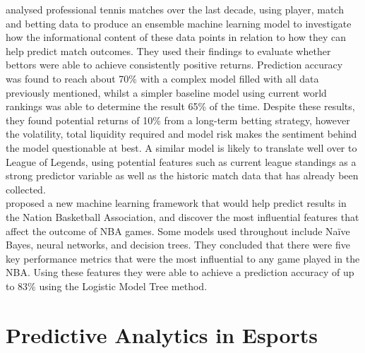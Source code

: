 \citet{wilkens2021sports} analysed professional tennis matches over the last decade, using player, match and betting data to produce an ensemble machine learning model to investigate how the informational content of these data points in relation to how they can help predict match outcomes.
They used their findings to evaluate whether bettors were able to achieve consistently positive returns.
Prediction accuracy was found to reach about 70\% with a complex model filled with all data previously mentioned, whilst a simpler baseline model using current world rankings was able to determine the result 65\% of the time.
Despite these results, they found potential returns of 10\% from a long-term betting strategy, however the volatility, total liquidity required and model risk makes the sentiment behind the model questionable at best.
A similar model is likely to translate well over to League of Legends, using potential features such as current league standings as a strong predictor variable as well as the historic match data that has already been collected. \\

\citet{thabtah2019nba} proposed a new machine learning framework that would help predict results in the Nation Basketball Association, and discover the most influential features that affect the outcome of NBA games.
Some models used throughout include Naïve Bayes, neural networks, and decision trees.
They concluded that there were five key performance metrics that were the most influential to any game played in the NBA\@.
Using these features they were able to achieve a prediction accuracy of up to 83\% using the Logistic Model Tree method.


\section{Predictive Analytics in Esports}\label{sec:PredictiveAnalyticsinEsports}
